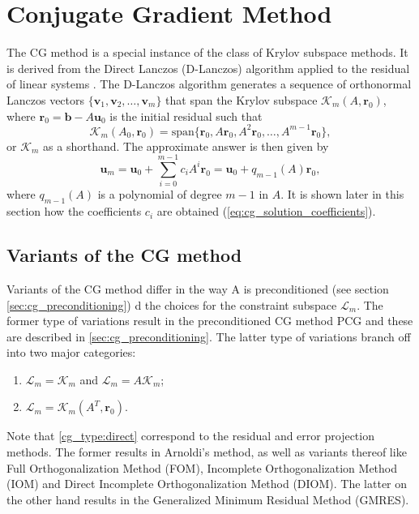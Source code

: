 \section{Conjugate Gradient Method}\label{sec:cg_method}
The CG method is a special instance of the class of Krylov subspace methods. It is derived from the Direct Lanczos (D-Lanczos) algorithm applied to the residual of linear systems \cite[Algorithm 6.17]{iter_method_saad}. The D-Lanczos algorithm generates a sequence of orthonormal Lanczos vectors $\{\mathbf{v}_1, \mathbf{v}_2, \dots, \mathbf{v}_m\}$ that span the Krylov subspace $\mathcal{K}_m(A, \mathbf{r}_0)$, where $\mathbf{r}_0 = \mathbf{b} - A\mathbf{u}_0$ is the initial residual such that
\begin{equation}
  \mathcal{K}_m(A_0, \mathbf{r}_0) = \text{span}\{\mathbf{r}_0, A\mathbf{r}_0, A^2\mathbf{r}_0, \dots, A^{m-1}\mathbf{r}_0\},
  \label{eq:cg_krylov_space}
\end{equation}
or $\mathcal{K}_m$ as a shorthand. The approximate answer is then given by
\begin{equation}
  \mathbf{u}_m = \mathbf{u}_0 + \sum_{i=0}^{m-1} c_i A^i \mathbf{r}_0 = \mathbf{u}_0 + q_{m-1}(A)\mathbf{r}_0,
  \label{eq:cg_approximate_solution}
\end{equation}
where $q_{m-1}(A)$ is a polynomial of degree $m-1$ in $A$. It is shown later in this section how the coefficients $c_i$ are obtained (\cref{eq:cg_solution_coefficients}).

\subsection{Variants of the CG method} \label{sec:cg_variants}
Variants of the CG method differ in the way A is preconditioned (see section \cref{sec:cg_preconditioning}) d the choices for the constraint subspace $\mathcal{L}_m$. The former type of variations result in the preconditioned CG method PCG and these are described in \cref{sec:cg_preconditioning}. The latter type of variations branch off into two major categories:
\begin{enumerate}[label=\roman*,ref=CG-type \roman*]
  \item\label{cg_type:direct} $\mathcal{L}_m = \mathcal{K}_m$ and $\mathcal{L}_m = A\mathcal{K}_m$;
  \item\label{cg_type:transpose}$\mathcal{L}_m = \mathcal{K}_m(A^T,\mathbf{r}_0)$.
\end{enumerate}
Note that \cref{cg_type:direct} correspond to the residual and error projection methods. The former results in Arnoldi's method, as well as variants thereof like Full Orthogonalization Method (FOM), Incomplete Orthogonalization Method (IOM) and Direct Incomplete Orthogonalization Method (DIOM). The latter on the other hand results in the Generalized Minimum Residual Method (GMRES).

